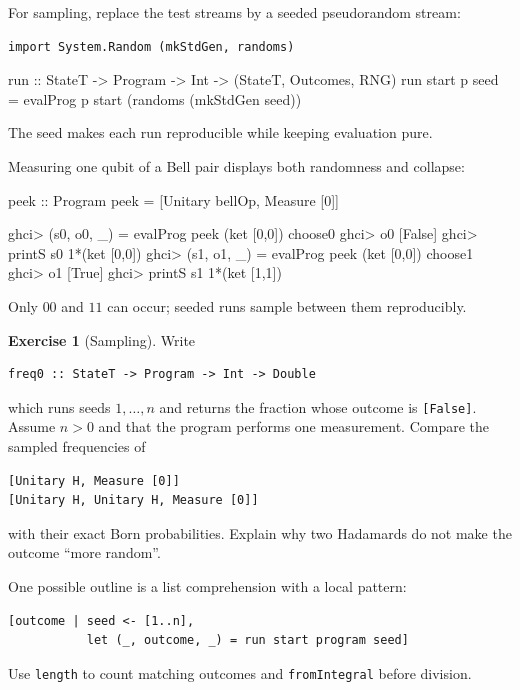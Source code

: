 \documentclass[11pt,a4paper]{article}
\theoremstyle{definition}
\newtheorem{exercise}{Exercise}[section]
\begin{document}
For sampling, replace the test streams by a seeded pseudorandom stream:
\begin{lstlisting}
import System.Random (mkStdGen, randoms)
\end{lstlisting}
\begin{qppcode}
run :: StateT -> Program -> Int -> (StateT, Outcomes, RNG)
run start p seed = evalProg p start (randoms (mkStdGen seed))
\end{qppcode}
The seed makes each run reproducible while keeping evaluation pure.

Measuring one qubit of a Bell pair displays both randomness and collapse:
\begin{qppcode}
peek :: Program
peek = [Unitary bellOp, Measure [0]]

ghci> (s0, o0, _) = evalProg peek (ket [0,0]) choose0
ghci> o0
[False]
ghci> printS s0
1*(ket [0,0])
ghci> (s1, o1, _) = evalProg peek (ket [0,0]) choose1
ghci> o1
[True]
ghci> printS s1
1*(ket [1,1])
\end{qppcode}
Only $00$ and $11$ can occur; seeded runs sample between them reproducibly.

\begin{exercise}[Sampling]
Write
\begin{lstlisting}
freq0 :: StateT -> Program -> Int -> Double
\end{lstlisting}
which runs seeds $1,\ldots,n$ and returns the fraction whose outcome is
\lstinline|[False]|.  Assume $n>0$ and that the program performs one
measurement.  Compare the sampled frequencies of
\begin{lstlisting}
[Unitary H, Measure [0]]
[Unitary H, Unitary H, Measure [0]]
\end{lstlisting}
with their exact Born probabilities.  Explain why two Hadamards do not make
the outcome ``more random''.

One possible outline is a list comprehension with a local pattern:
\begin{lstlisting}
[outcome | seed <- [1..n],
           let (_, outcome, _) = run start program seed]
\end{lstlisting}
Use \lstinline|length| to count matching outcomes and
\lstinline|fromIntegral| before division.
\end{exercise}
\end{document}
